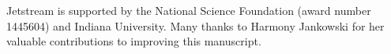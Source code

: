 \documentclass[acmsmall, authorversion]{acmart}
\begin{document}
\begin{acks}
Jetstream is supported by the National Science Foundation (award number 1445604) and Indiana University. Many thanks to Harmony Jankowski for her valuable contributions to improving this manuscript.
\end{acks}




\end{document}
